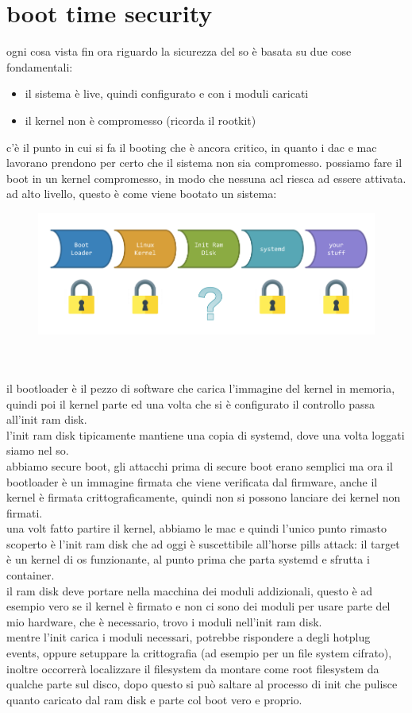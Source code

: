 \documentclass[12pt, oneside]{extbook} %
\begin{document}
\section{boot time security}
ogni cosa vista fin ora riguardo la sicurezza del so è basata su due cose fondamentali:
\begin{itemize}
\item il sistema è live, quindi configurato e con i moduli caricati
\item il kernel non è compromesso (ricorda il rootkit)
\end{itemize}
c'è il punto in cui si fa il booting che è ancora critico, in quanto i dac e mac lavorano prendono per certo che il sistema non sia compromesso. possiamo fare il boot in un kernel compromesso, in modo che nessuna acl riesca ad essere attivata.\\ad alto livello, questo è come viene bootato un sistema:\\
\begin{figure}[!h]
	\includegraphics[scale=0.4]{immagini/boot_scheme.png}
\end{figure}\\\\
il bootloader è il pezzo di software che carica l'immagine del kernel in memoria, quindi poi il kernel parte ed una volta che si è configurato il controllo passa all'init ram disk.\\l'init ram disk tipicamente mantiene una copia di systemd, dove una volta loggati siamo nel so.\\abbiamo secure boot, gli attacchi prima di secure boot erano semplici ma ora il bootloader è un immagine firmata che viene verificata dal firmware, anche il kernel è firmata crittograficamente, quindi non si possono lanciare dei kernel non firmati.\\una volt fatto partire il kernel, abbiamo le mac e quindi l'unico punto rimasto scoperto è l'init ram disk che ad oggi è suscettibile all'horse pills attack: il target è un kernel di os funzionante, al punto prima che parta systemd e sfrutta i container.\\ il ram disk deve portare nella macchina dei moduli addizionali, questo è ad esempio vero se il kernel è firmato e non ci sono dei moduli per usare parte del mio hardware, che è necessario, trovo i moduli nell'init ram disk.\\mentre l'init carica i moduli necessari, potrebbe rispondere a degli hotplug events, oppure setuppare la crittografia (ad esempio per un file system cifrato), inoltre occorrerà localizzare il filesystem da montare come root filesystem da qualche parte sul disco, dopo questo si può saltare al processo di init che pulisce quanto caricato dal ram disk e parte col boot vero e proprio.
\end{document}
